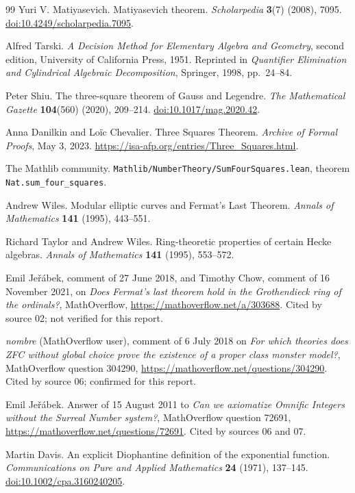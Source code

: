 \documentclass[11pt,oneside]{article}
\numberwithin{equation}{section}
\theoremstyle{definition}
\theoremstyle{remark}
\newcommand{\fn}[1]{\nolinkurl{#1}}
\begin{document}
\begin{thebibliography}{99}
Yuri V. Matiyasevich.
Matiyasevich theorem. \emph{Scholarpedia} \textbf{3}(7) (2008), 7095.
\href{https://doi.org/10.4249/scholarpedia.7095}{doi:10.4249/scholarpedia.7095}.

Alfred Tarski.
\emph{A Decision Method for Elementary Algebra and Geometry}, second edition,
University of California Press, 1951. Reprinted in \emph{Quantifier
Elimination and Cylindrical Algebraic Decomposition}, Springer, 1998,
pp.~24--84.

Peter Shiu.
The three-square theorem of Gauss and Legendre.
\emph{The Mathematical Gazette} \textbf{104}(560) (2020), 209--214.
\href{https://doi.org/10.1017/mag.2020.42}{doi:10.1017/mag.2020.42}.

Anna Danilkin and Lo\"ic Chevalier.
Three Squares Theorem.
\emph{Archive of Formal Proofs}, May 3, 2023.
\url{https://isa-afp.org/entries/Three_Squares.html}.

The Mathlib community.
\fn{Mathlib/NumberTheory/SumFourSquares.lean},
theorem \fn{Nat.sum_four_squares}.

Andrew Wiles.
Modular elliptic curves and Fermat's Last Theorem.
\emph{Annals of Mathematics} \textbf{141} (1995), 443--551.

Richard Taylor and Andrew Wiles.
Ring-theoretic properties of certain Hecke algebras.
\emph{Annals of Mathematics} \textbf{141} (1995), 553--572.

Emil Je\v r\'abek, comment of 27 June 2018, and Timothy Chow, comment of
16 November 2021, on \emph{Does Fermat's last theorem hold in the Grothendieck
ring of the ordinals?}, MathOverflow,
\url{https://mathoverflow.net/a/303688}. Cited by source 02; not verified for
this report.

\emph{nombre} (MathOverflow user), comment of 6 July 2018 on \emph{For which
theories does ZFC without global choice prove the existence of a proper class
monster model?}, MathOverflow question 304290,
\url{https://mathoverflow.net/questions/304290}. Cited by source 06; confirmed
for this report.

Emil Je\v r\'abek.
Answer of 15 August 2011 to \emph{Can we axiomatize Omnific Integers without
the Surreal Number system?}, MathOverflow question 72691,
\url{https://mathoverflow.net/questions/72691}. Cited by sources 06 and 07.

Martin Davis.
An explicit Diophantine definition of the exponential function.
\emph{Communications on Pure and Applied Mathematics} \textbf{24} (1971),
137--145.
\href{https://doi.org/10.1002/cpa.3160240205}{doi:10.1002/cpa.3160240205}.


\end{thebibliography}
\end{document}
